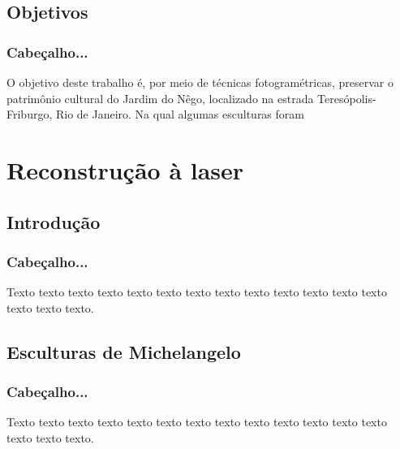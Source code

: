 \documentclass[table, usenames, svgnames, dvipsnames]{beamer}
\begin{document}
\subsection{Objetivos}

\begin{frame} 
\frametitle{\textbf{Cabeçalho...}}
	\begin{center}
		O objetivo deste trabalho é, por meio de técnicas fotogramétricas, preservar o patrimônio cultural 
		do Jardim do Nêgo, localizado na estrada Teresópolis-Friburgo, Rio de Janeiro. Na qual algumas esculturas 
		foram 
	\end{center}
\end{frame}

\section{Reconstrução à laser}

\subsection{Introdução}

\begin{frame} 
\frametitle{\textbf{Cabeçalho...}}
	\begin{center}
		Texto texto texto texto texto texto texto texto texto texto texto texto texto
		texto texto texto.
	\end{center}
\end{frame}

\subsection{Esculturas de Michelangelo}

\begin{frame} 
\frametitle{\textbf{Cabeçalho...}}
	\begin{center}
		Texto texto texto texto texto texto texto texto texto texto texto texto texto
		texto texto texto.
	\end{center}
\end{frame}
\end{document}
